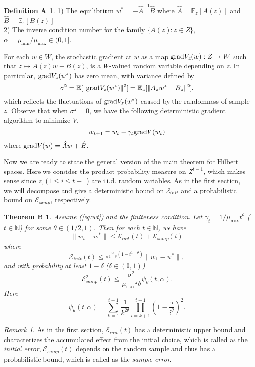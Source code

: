 \documentclass[twoside]{amsart}
\theoremstyle{theorem}
\newtheorem*{thmb}{Theorem B}
\theoremstyle{definition}
\newtheorem*{defa}{Definition A}
\theoremstyle{remark}
\newtheorem{rem}[thm]{Remark}
\def\Err{{\mathscr E}}
\def\N{{\mathbb N}}
\def\grad{{\rm grad}}
\def\amax{{\mu_{\max}}}
\def\amin{{\mu_{\min}} }
\def\E{{\mathbb E}}        %
\begin{document}
\begin{defa} 1) The equilibrium $w^\ast= -\hat{A}^{-1} \hat{B}$ where $\hat{A}= \E_z[A(z)]$ and $\hat{B}=\E_z[B(z)]$. \\
2) The inverse condition number for the family $\{A(z):z\in Z\}$, $\alpha=\amin/\amax\in (0, 1]$.
\end{defa}

For each $w\in W$, the stochastic gradient at $w$ as a map $\grad V_z(w): Z\to W$ such that $z\mapsto A(z)w+B(z)$, is a
$W$-valued random variable depending on $z$.
In particular, $\grad V_z(w^\ast)$ has zero mean, with variance defined by
$$\sigma^2 = \E[\|\grad V_z(w^\ast)\|^2]= \E_z [\| A_z w^\ast + B_z \|^2],$$
which reflects the fluctuations of $\grad V_z(w^\ast)$ caused by
the randomness of sample $z$. Observe that when $\sigma^2=0$, we
have the following deterministic gradient algorithm to minimize
$V$,
\[w_{t+1}= w_t - \gamma_t \grad V(w_t) \]
where $\grad V(w)= \hat{A}w+\hat{B}$.

Now we are ready to state the general version of the main theorem for Hilbert spaces. Here we consider
the product probability measure on $Z^{t-1}$, which makes sense since $z_i$ ($1\leq i \leq t-1$) are i.i.d. random variables. As in
the first
section, we will decompose
and give a deterministic bound on $\Err_{init}$ and a probabilistic bound on $\Err_{samp}$, respectively.


\begin{thmb}\label{thm:markov} Assume (\ref{eq:wt}) and the finiteness condition. Let $\gamma_t=1/\amax t^\theta$ ($t\in \N$)
for some $\theta\in(1/2,1)$. Then for each $t\in \N$, we have
\begin{equation}
\|w_t - w^\ast\| \leq \Err_{init}(t) + \Err_{samp}(t)
\end{equation}
where
\[ \Err_{init}(t)\leq e^{\frac{\alpha}{1-\theta}(1-t^{1-\theta})} \|w_1-w^\ast\|,\]
and with probability at least $1-\delta$ ($\delta\in (0,1)$)
\[ \Err_{samp}^2(t) \leq \frac{\sigma^2}{\amax^2 \delta} \psi_\theta(t,\alpha). \]
Here
\[ \psi_\theta(t,\alpha) = \sum_{k=1}^{t-1} \frac{1}{k^{2\theta}} \prod_{i=k+1}^{t-1} \left(1-\frac{\alpha}{i^\theta}\right)^2 .
\]
\end{thmb}

\begin{rem}
As in the first section, $\Err_{init}(t)$ has a deterministic upper bound and characterizes the accumulated effect from the initial choice, which is called
as the \emph{initial error}, $\Err_{samp}(t)$ depends on the random sample and thus has a probabilistic bound, which is called as the \emph{sample error}.
\end{rem}
\end{document}
